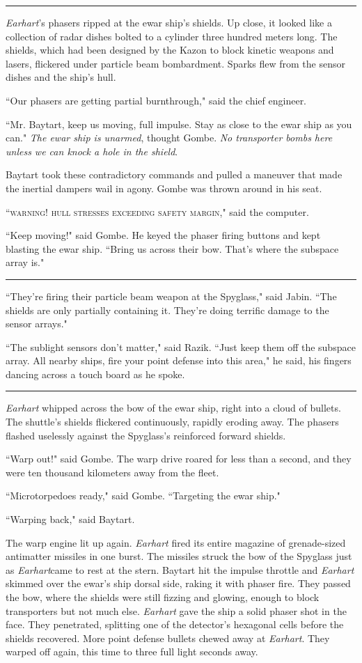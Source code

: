 \documentclass[twoside,letterpaper,12pt]{memoir}
\begin{document}
\fancybreak{\rule{3cm}{0.4 pt}}
\textit{Earhart}'s phasers ripped at the ewar ship's shields. Up close, it looked like a collection of radar dishes bolted to a cylinder three hundred meters long. The shields, which had been designed by the Kazon to block kinetic weapons and lasers, flickered under particle beam bombardment. Sparks flew from the sensor dishes and the ship's hull.

``Our phasers are getting partial burnthrough," said the chief engineer.

``Mr. Baytart, keep us moving, full impulse. Stay as close to the ewar ship as you can." \textit{The ewar ship is unarmed}, thought Gombe. \textit{No transporter bombs here unless we can knock a hole in the shield}.

Baytart took these contradictory commands and pulled a maneuver that made the inertial dampers wail in agony. Gombe was thrown around in his seat.

``\textsc{warning! hull stresses exceeding safety margin}," said the computer.

``Keep moving!" said Gombe. He keyed the phaser firing buttons and kept blasting the ewar ship. ``Bring us across their bow. That's where the subspace array is."

\fancybreak{\rule{3cm}{0.4 pt}}
``They're firing their particle beam weapon at the Spyglass," said Jabin. ``The shields are only partially containing it. They're doing terrific damage to the sensor arrays."

``The sublight sensors don't matter," said Razik. ``Just keep them off the subspace array. All nearby ships, fire your point defense into this area," he said, his fingers dancing across a touch board as he spoke.

\fancybreak{\rule{3cm}{0.4 pt}}
\textit{Earhart} whipped across the bow of the ewar ship, right into a cloud of bullets. The shuttle's shields flickered continuously, rapidly eroding away. The phasers flashed uselessly against the Spyglass's reinforced forward shields.

``Warp out!" said Gombe. The warp drive roared for less than a second, and they were ten thousand kilometers away from the fleet.

``Microtorpedoes ready," said Gombe. ``Targeting the ewar ship."

``Warping back," said Baytart.

The warp engine lit up again. \textit{Earhart} fired its entire magazine of grenade-sized antimatter missiles in one burst. The missiles struck the bow of the Spyglass just as \textit{Earhart}came to rest at the stern. Baytart hit the impulse throttle and \textit{Earhart} skimmed over the ewar's ship dorsal side, raking it with phaser fire. They passed the bow, where the shields were still fizzing and glowing, enough to block transporters but not much else. \textit{Earhart} gave the ship a solid phaser shot in the face. They penetrated, splitting one of the detector's hexagonal cells before the shields recovered. More point defense bullets chewed away at \textit{Earhart}. They warped off again, this time to three full light seconds away.
\end{document}

